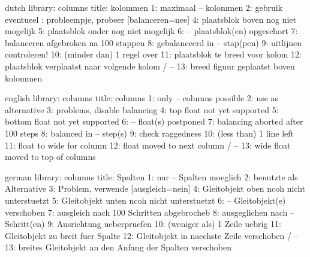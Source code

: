 

\unprotect


\startmessages  dutch  library: columns
  title: kolommen
      1: maximaal -- kolommen
      2: gebruik eventueel \string{}: probleempje, probeer [balanceren=nee]
      4: plaatsblok boven nog niet mogelijk
      5: plaatsblok onder nog niet mogelijk
      6: -- plaatsblok(en) opgeschort
      7: balanceren afgebroken na 100 stappen
      8: gebalanceerd in -- stap(pen)
      9: uitlijnen controleren!
     10: (minder dan) 1 regel over
     11: plaatsblok te breed voor kolom
     12: plaatsblok verplaatst naar volgende kolom / --
     13: breed figuur geplaatst boven kolommen
\stopmessages

\startmessages  english  library: columns
  title: columns
      1: only -- columns possible
      2: use \string\filbreak\space as alternative
      3: problems, disable balancing
      4: top float not yet supported
      5: bottom float not yet supported
      6: -- float(s) postponed
      7: balancing aborted after 100 steps
      8: balanced in -- step(s)
      9: check raggedness
     10: (less than) 1 line left
     11: float to wide for column
     12: float moved to next column / --
     13: wide float moved to top of columns
\stopmessages

\startmessages  german  library: columns
  title: Spalten
      1: nur -- Spalten moeglich
      2: benutzte \string\filbreak\space als Alternative
      3: Problem, verwende [ausgleich=nein]
      4: Gleitobjekt oben ncoh nicht unterstuetzt
      5: Gleitobjekt unten ncoh nicht unterstuetzt
      6: -- Gleitobjekt(e) verschoben
      7: ausgleich nach 100 Schritten abgebrocheb
      8: ausgeglichen nach  -- Schritt(en)
      9: Ausrichtung ueberpruefen
     10: (weniger als) 1 Zeile uebrig
     11: Gleitobjekt zu breit fuer Spalte
     12: Gleitobjekt in naechste Zeile verschoben / -- 
     13: breites Gleitobjekt an den Anfang der Spalten verschoben
\stopmessages

